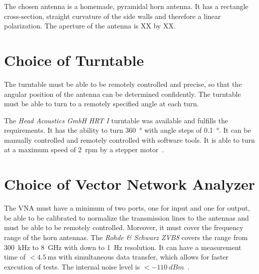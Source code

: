 The chosen antenna is a homemade, pyramidal horn antenna. It has a rectangle cross-section, straight curvature of the side walls and therefore a linear polarization. The aperture of the antenna is XX by XX.



\section{Choice of Turntable}
The turntable must be able to be remotely controlled and precise, so that the angular position of the antenna can be determined confidently. The turntable must be able to turn to a remotely specified angle at each turn. 

The \textit{Head Acoustics GmbH HRT I} turntable was available and fulfills the requirements. It has the ability to turn \SI{360}{\degree} with angle steps of \SI{0.1}{\degree}. It can be manually controlled and remotely controlled with software tools. It is able to turn at a maximum speed of \SI{2}{rpm} by a stepper motor~\cite{hrt_i_data_sheet}. 



\section{Choice of Vector Network Analyzer}
The VNA must have a minimum of two ports, one for input and one for output, be able to be calibrated to normalize the transmission lines to the antennas and must be able to be remotely controlled. Moreover, it must cover the frequency range of the horn antennas. The \textit{Rohde \& Schwarz ZVB8} covers the range from \SI{300}{\kilo\hertz} to \SI{8}{\giga\hertz} with down to \SI{1}{\hertz} resolution. It can have a measurement time of $<\SI{4.5}{\milli\second}$ with simultaneous data transfer, which allows for faster execution of tests. The internal noise level is $<-\SI{110}{dBm}$~\cite{vna_data_sheet_descrip}.



